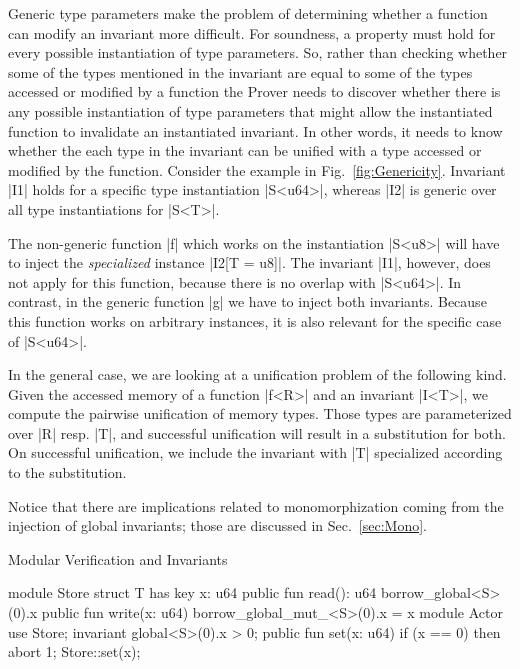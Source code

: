 Generic type parameters make the problem of determining whether a
function can modify an invariant more difficult.
For soundness, a property must hold for every possible instantiation
of type parameters.
So, rather than checking
whether some of the types mentioned in the invariant are equal to some
of the types accessed or modified by a function
the Prover needs to
discover whether there is any possible instantiation of type parameters
that might allow the instantiated function to invalidate an instantiated invariant.
In other words, it needs to know whether the
each type in the invariant can be unified with a type accessed or modified by
the function.
Consider the example
in Fig.~\ref{fig:Genericity}. Invariant |I1| holds for a specific type
instantiation |S<u64>|, whereas |I2| is generic over all type instantiations for
|S<T>|.

The non-generic function |f| which works on the instantiation |S<u8>| will have
to inject the \emph{specialized} instance |I2[T = u8]|. The invariant |I1|,
however, does not apply for this function, because there is no overlap with
|S<u64>|.  In contrast, in the generic function |g| we have to inject both
invariants. Because this function works on arbitrary instances, it is also
relevant for the specific case of |S<u64>|.

In the general case, we are looking at a unification problem of the following
kind. Given the accessed memory of a function |f<R>| and an invariant |I<T>|, we
compute the pairwise unification of memory types. Those types are parameterized
over |R| resp. |T|, and successful unification will result in a substitution
for both. On successful unification, we include the invariant with |T| specialized
according to the substitution.

Notice that there are implications related to monomorphization coming from the
injection of global invariants; those are discussed in Sec.~\ref{sec:Mono}.



\begin{Figure}
  \caption{Modular Verification and Invariants}
  \label{fig:ModularVerificationInv}
  \centering
\begin{MoveBox}
  module Store {
    struct T has key { x: u64 }
    public fun read(): u64 { borrow_global<S>(0).x }
    public fun write(x: u64) { borrow_global_mut_<S>(0).x = x }
  }
  module Actor {
    use Store;
    invariant global<S>(0).x > 0;
    public fun set(x: u64) {
      if (x == 0) then abort 1;
      Store::set(x);
    }
  }
\end{MoveBox}
\end{Figure}

